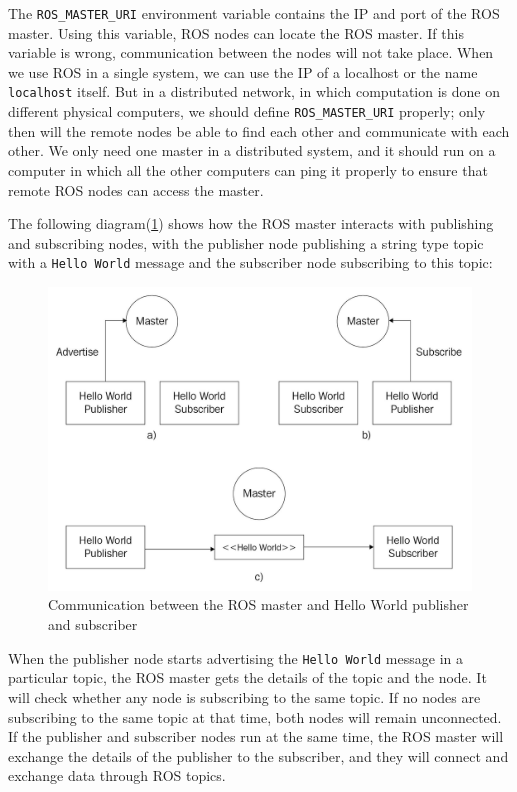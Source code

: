 \documentclass[../../main]{subfiles}
\begin{document}
The \texttt{ROS\_MASTER\_URI} environment variable contains the IP and port of the ROS master. Using this variable, ROS nodes can locate the ROS master. If this variable is wrong, communication between the nodes will not take place. When we use ROS in a single system, we can use the IP of a localhost or the name \texttt{localhost} itself. But in a distributed network, in which computation is done on different physical computers, we should define \texttt{ROS\_MASTER\_URI} properly; only then will the remote nodes be able to find each other and communicate with each other. We only need one master in a distributed system, and it should run on a computer in which all the other computers can ping it properly to ensure that remote ROS nodes can access the master.


The following diagram(\cref{fig:helloWorld}) shows how the ROS master interacts with publishing and
subscribing nodes, with the publisher node publishing a string type topic with a \texttt{Hello
World} message and the subscriber node subscribing to this topic:
\begin{figure}[ht]
    \centering
    \includegraphics{img/helloWorld.jpg}
    \caption[ROS Communication Overview]{Communication between the ROS master and Hello World publisher and subscriber}
    \label{fig:helloWorld}
\end{figure}
When the publisher node starts advertising the \texttt{Hello World} message in a particular
topic, the ROS master gets the details of the topic and the node. It will check whether any
node is subscribing to the same topic. If no nodes are subscribing to the same topic at that
time, both nodes will remain unconnected. If the publisher and subscriber nodes run at
the same time, the ROS master will exchange the details of the publisher to the subscriber,
and they will connect and exchange data through ROS topics.
\end{document}
